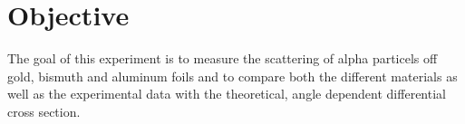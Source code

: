 \section{Objective}

The goal of this experiment is to measure the scattering of alpha particels off gold, bismuth and aluminum foils
and to compare both the different materials as well as the experimental data with the theoretical, angle dependent differential cross section.